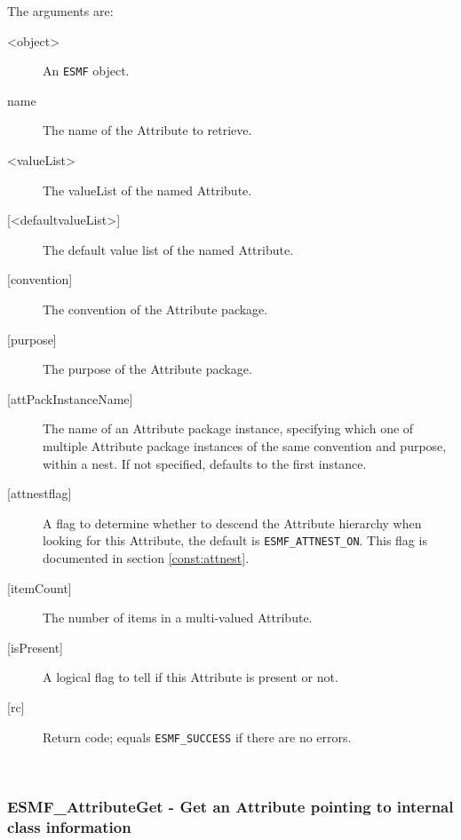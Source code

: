    The arguments are:
   \begin{description}
   \item [<object>]
   An {\tt ESMF} object.
   \item [name]
   The name of the Attribute to retrieve.
   \item [<valueList>]
   The valueList of the named Attribute.
   \item [{[<defaultvalueList>]}]
   The default value list of the named Attribute.
   \item [{[convention]}]
   The convention of the Attribute package.
   \item [{[purpose]}]
   The purpose of the Attribute package.
   \item [{[attPackInstanceName]}]
   The name of an Attribute package instance, specifying which one
   of multiple Attribute package instances of the same convention
   and purpose, within a nest. If not specified, defaults to the
   first instance.
   \item [{[attnestflag]}]
   A flag to determine whether to descend the
   Attribute hierarchy when looking for this Attribute, the default
   is {\tt ESMF\_ATTNEST\_ON}. This flag is documented in section
   \ref{const:attnest}.
   \item [{[itemCount]}]
   The number of items in a multi-valued Attribute.
   \item [{[isPresent]}]
   A logical flag to tell if this Attribute is present or not.
   \item [{[rc]}]
   Return code; equals {\tt ESMF\_SUCCESS} if there are no errors.
   \end{description}
  
   
 
\mbox{}\hrulefill\ 
 
\subsubsection [ESMF\_AttributeGet] {ESMF\_AttributeGet - Get an Attribute pointing to internal class information}


